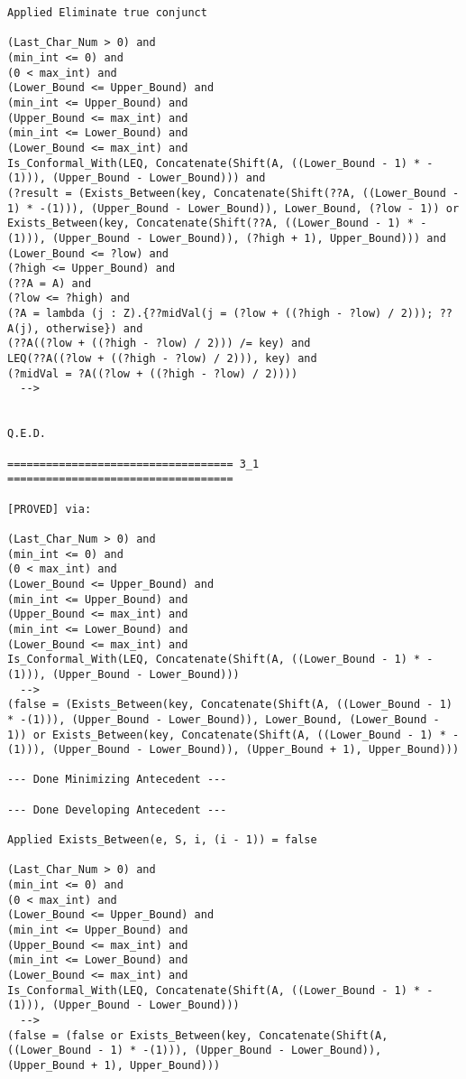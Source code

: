 \begin{lstlisting}[language=resolve]
Applied Eliminate true conjunct

(Last_Char_Num > 0) and
(min_int <= 0) and
(0 < max_int) and
(Lower_Bound <= Upper_Bound) and
(min_int <= Upper_Bound) and
(Upper_Bound <= max_int) and
(min_int <= Lower_Bound) and
(Lower_Bound <= max_int) and
Is_Conformal_With(LEQ, Concatenate(Shift(A, ((Lower_Bound - 1) * -(1))), (Upper_Bound - Lower_Bound))) and
(?result = (Exists_Between(key, Concatenate(Shift(??A, ((Lower_Bound - 1) * -(1))), (Upper_Bound - Lower_Bound)), Lower_Bound, (?low - 1)) or Exists_Between(key, Concatenate(Shift(??A, ((Lower_Bound - 1) * -(1))), (Upper_Bound - Lower_Bound)), (?high + 1), Upper_Bound))) and
(Lower_Bound <= ?low) and
(?high <= Upper_Bound) and
(??A = A) and
(?low <= ?high) and
(?A = lambda (j : Z).{??midVal(j = (?low + ((?high - ?low) / 2))); ??A(j), otherwise}) and
(??A((?low + ((?high - ?low) / 2))) /= key) and
LEQ(??A((?low + ((?high - ?low) / 2))), key) and
(?midVal = ?A((?low + ((?high - ?low) / 2))))
  -->


Q.E.D.

=================================== 3_1 ===================================

[PROVED] via:

(Last_Char_Num > 0) and
(min_int <= 0) and
(0 < max_int) and
(Lower_Bound <= Upper_Bound) and
(min_int <= Upper_Bound) and
(Upper_Bound <= max_int) and
(min_int <= Lower_Bound) and
(Lower_Bound <= max_int) and
Is_Conformal_With(LEQ, Concatenate(Shift(A, ((Lower_Bound - 1) * -(1))), (Upper_Bound - Lower_Bound)))
  -->
(false = (Exists_Between(key, Concatenate(Shift(A, ((Lower_Bound - 1) * -(1))), (Upper_Bound - Lower_Bound)), Lower_Bound, (Lower_Bound - 1)) or Exists_Between(key, Concatenate(Shift(A, ((Lower_Bound - 1) * -(1))), (Upper_Bound - Lower_Bound)), (Upper_Bound + 1), Upper_Bound)))

--- Done Minimizing Antecedent ---

--- Done Developing Antecedent ---

Applied Exists_Between(e, S, i, (i - 1)) = false

(Last_Char_Num > 0) and
(min_int <= 0) and
(0 < max_int) and
(Lower_Bound <= Upper_Bound) and
(min_int <= Upper_Bound) and
(Upper_Bound <= max_int) and
(min_int <= Lower_Bound) and
(Lower_Bound <= max_int) and
Is_Conformal_With(LEQ, Concatenate(Shift(A, ((Lower_Bound - 1) * -(1))), (Upper_Bound - Lower_Bound)))
  -->
(false = (false or Exists_Between(key, Concatenate(Shift(A, ((Lower_Bound - 1) * -(1))), (Upper_Bound - Lower_Bound)), (Upper_Bound + 1), Upper_Bound)))


\end{lstlisting}
